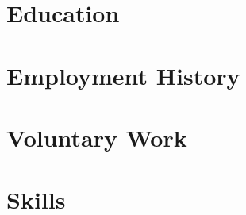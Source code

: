 \documentclass[a4paper]{article}
\newcommand{\src}{"../../Google Drive/cv-source"}
\begin{document}




\section{Education}


\section{Employment History}


\section{Voluntary Work}


\section{Skills}


%
\end{document}

